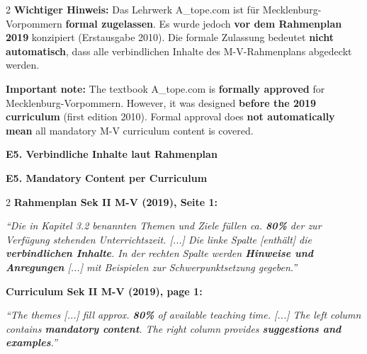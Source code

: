 \documentclass[10pt,a4paper]{article}
\newcommand{\secbil}[2]{%
\vspace{6pt}
\noindent\colorbox{spaet}{\parbox{0.48\textwidth}{\color{white}\bfseries\small #1}}%
\hfill%
\colorbox{english}{\parbox{0.48\textwidth}{\color{white}\bfseries\small #2}}
\vspace{3pt}
}
\begin{document}
\vspace{2mm}

\begin{paracol}{2}
\scriptsize
\textbf{Wichtiger Hinweis:} Das Lehrwerk A\_tope.com ist für Mecklenburg-Vorpommern \textbf{formal zugelassen}. Es wurde jedoch \textbf{vor dem Rahmenplan 2019} konzipiert (Erstausgabe 2010). Die formale Zulassung bedeutet \textbf{nicht automatisch}, dass alle verbindlichen Inhalte des M-V-Rahmenplans abgedeckt werden.

\switchcolumn

\scriptsize\color{english}
\textbf{Important note:} The textbook A\_tope.com is \textbf{formally approved} for Mecklenburg-Vorpommern. However, it was designed \textbf{before the 2019 curriculum} (first edition 2010). Formal approval does \textbf{not automatically mean} all mandatory M-V curriculum content is covered.

\end{paracol}

\vspace{3mm}

\secbil{E5. Verbindliche Inhalte laut Rahmenplan}{E5. Mandatory Content per Curriculum}

\vspace{2mm}

\begin{paracol}{2}
\scriptsize
\textbf{Rahmenplan Sek II M-V (2019), Seite 1:}

\textit{``Die in Kapitel 3.2 benannten Themen und Ziele füllen ca. \textbf{80\%} der zur Verfügung stehenden Unterrichtszeit. [...] Die linke Spalte [enthält] die \textbf{verbindlichen Inhalte}. In der rechten Spalte werden \textbf{Hinweise und Anregungen} [...] mit Beispielen zur Schwerpunktsetzung gegeben.''}

\switchcolumn

\scriptsize\color{english}
\textbf{Curriculum Sek II M-V (2019), page 1:}

\textit{``The themes [...] fill approx. \textbf{80\%} of available teaching time. [...] The left column contains \textbf{mandatory content}. The right column provides \textbf{suggestions and examples}.''}

\end{paracol}

\vspace{2mm}
\end{document}
